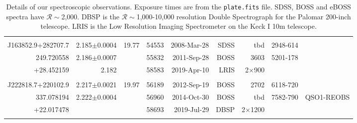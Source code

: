 \documentclass[a4paper,fleqn,usenatbib]{mnras}
\begin{document}
\begin{table}
\begin{tabular}{r  r  r r r   r r r r}
                                         &                                       &                          &                &                          &                   &                                &                              & \\
    J163852.9+282707.7   & 2.185$\pm$0.0004       &   19.77              &  54553    & 2008-Mar-28     & SDSS             & tbd                          &  2948-614              & \\
    249.720558	                 &  2.186$\pm$0.0007     &                          &  55832    & 2011-Sep-28     & BOSS            &   3603                  &  5201-178            & \\
    +28.452159                 &  2.182                           &                          &  58583    & 2019-Apr-10      & LRIS              &  2$\times$900    &                              & \\
                                        &                                      &                          &                &                           &                   &                              &                                & \\
    J222818.7+220102.9   & 2.217$\pm$0.0021      & 19.97                &  56189    & 2012-Sep-19      & BOSS             &  2702                 &   6118-720          & \\
    337.078194                 & 2.222$\pm$0.0004      &                          &  56960    & 2014-Oct-30      & BOSS             & tbd                         &   7582-790          & QSO1-REOBS \\ 
    +22.017478                &                                      &                          &  58693    & 2019-Jul-29        & DBSP              & 2$\times$1200  &                           &    \\
                                       &                                       &                          &               &                             &                   &                              &                            & \\
    \hline \hline   
  \end{tabular}
  \caption{
    Details of our spectroscopic observations. 
    Exposure times are from the {\tt plate.fits} file.  SDSS, BOSS and
    eBOSS spectra have $\mathcal{R}\sim$2,000.  DBSP is the
    $\mathcal{R}\sim$1,000-10,000 resolution Double Spectrograph for the
    Palomar 200-inch telescope.  LRIS is the Low Resolution Imaging
    Spectrometer on the Keck I 10m telescope.} 
  \label{tab:obs_notes}
\end{table}
\end{document}
